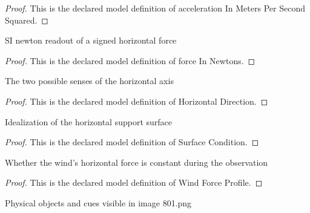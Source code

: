 \begin{proof}
  This is the declared model definition of acceleration In Meters Per Second Squared.
\end{proof}
\begin{definition}
  \label{def:physics:phyx-mini-0801:phyxminiproblems-problemphyxmini0801-forceinnewtons}
  SI newton readout of a signed horizontal force
\end{definition}
\begin{proof}
  This is the declared model definition of force In Newtons.
\end{proof}
\begin{definition}
  \label{def:physics:phyx-mini-0801:phyxminiproblems-problemphyxmini0801-horizontaldirection}
  The two possible senses of the horizontal axis
\end{definition}
\begin{proof}
  This is the declared model definition of Horizontal Direction.
\end{proof}
\begin{definition}
  \label{def:physics:phyx-mini-0801:phyxminiproblems-problemphyxmini0801-surfacecondition}
  Idealization of the horizontal support surface
\end{definition}
\begin{proof}
  This is the declared model definition of Surface Condition.
\end{proof}
\begin{definition}
  \label{def:physics:phyx-mini-0801:phyxminiproblems-problemphyxmini0801-windforceprofile}
  Whether the wind's horizontal force is constant during the observation
\end{definition}
\begin{proof}
  This is the declared model definition of Wind Force Profile.
\end{proof}
\begin{definition}
  \label{def:physics:phyx-mini-0801:phyxminiproblems-problemphyxmini0801-figureobject}
  Physical objects and cues visible in image 801.png
\end{definition}
